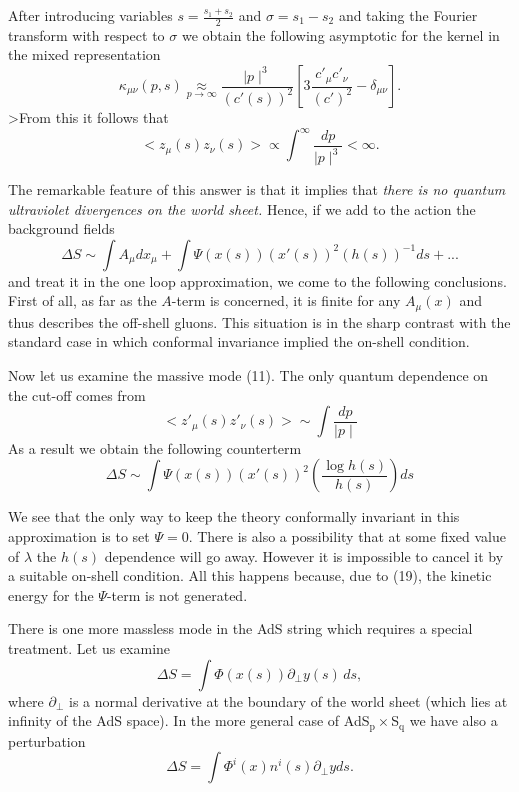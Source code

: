 \documentclass[a4paper,12pt]{article}
\begin{document}
After introducing variables $s=\frac{s_{1}+s_{2}}{2}$ and $\sigma
=s_{1}-s_{2}$ and taking the Fourier transform with respect to $\sigma $ we
obtain the following asymptotic for the kernel in the mixed representation 
\begin{equation}
\kappa _{\mu \nu }(p,s)\underset{p\rightarrow \infty }{\approx }\frac{\mid
p\mid ^{3}}{(c'(s))^{2}}[3\frac{c'_{\mu }c'_{\nu
}}{(c')^{2}}-\delta _{\mu \nu }].
\end{equation}
>From this it follows that 
\begin{equation}
<z_{\mu }(s)z_{\nu }(s)>\varpropto \int^{\infty }\frac{dp}{\mid p\mid ^{3}}%
<\infty.
\end{equation}

The remarkable feature of this answer is that it implies that \emph{there is
no quantum ultraviolet divergences on the world sheet.} Hence, if we add to
the action the background fields 
\begin{equation}
\Delta S\sim \int A_{\mu }dx_{\mu }+\int \Psi (x(s))(x'(s))^{2}(h(s))^{-1}ds+...
\end{equation}
and treat it in the one loop approximation, we come to the following
conclusions. First of all, as far as the $A$-term is concerned, it is finite
for any $A_{\mu }(x)$ and thus describes the off-shell gluons. This
situation is in the sharp contrast with the standard case in which conformal
invariance implied the on-shell condition.

Now let us examine the massive mode (11). The only quantum dependence on the
cut-off comes from 
\begin{equation}
<z'_{\mu }(s)z'_{\nu }(s)>\sim \int \frac{dp}{\mid
p\mid }
\end{equation}
As a result we obtain the following counterterm 
\begin{equation}
\Delta S\sim \int \Psi (x(s))(x'(s))^{2}(\frac{\log h(s)}{h(s)}%
)ds
\end{equation}

We see that the only way to keep the theory conformally invariant in this
approximation is to set $\Psi =0$. There is also a possibility that at some
fixed value of $\lambda $ the $h(s)$ dependence will go away. However it is
impossible to cancel it by a suitable on-shell condition. All this happens
because, due to (19), the kinetic energy for the $\Psi $-term is not
generated.

There is one more massless mode in the AdS string which requires a special
treatment. Let us examine 
\begin{equation}
\Delta S=\int \Phi (x(s))\partial _{\bot }y(s)\,ds,
\end{equation}
where $\partial _{\bot }$ is a normal derivative at the boundary of the
world sheet (which lies at infinity of the AdS space). In the more general
case of AdS$_{\text{p}}\times $S$_{\text{q}}$ we have also a perturbation 
\begin{equation}
\Delta S=\int \Phi ^{i}(x)n^{i}(s)\partial _{\bot }yds.
\end{equation}
\end{document}
